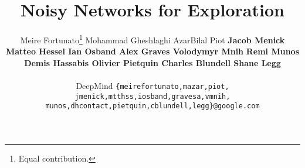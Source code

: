 \documentclass{article}
\title{Noisy Networks for Exploration}
\author{Meire Fortunato\thanks{Equal contribution.}
\quad Mohammad Gheshlaghi Azar\footnotemark[1]
\quad Bilal Piot \footnotemark[1] \And
\textbf{Jacob Menick
\quad  Matteo Hessel
\quad Ian Osband
\quad Alex Graves
\quad Volodymyr Mnih} \And
\textbf{Remi Munos
\quad Demis Hassabis 
\quad Olivier Pietquin
\quad Charles Blundell 
\quad Shane Legg}  \\ \\
DeepMind
  \texttt{\{meirefortunato,mazar,piot,} \\
  \texttt{jmenick,mtthss,iosband,gravesa,vmnih,}\\
  \texttt{munos,dhcontact,pietquin,cblundell,legg\}@google.com} \\
}
\begin{document}
\maketitle


\newcommand{\Exp}{\mathds{E}}
\newcommand{\Expk}{\mathds{E}_{k}}
\newcommand{\Nat}{\mathbb{N}}
\newcommand{\Ind}{\mathds{1}}
\newcommand{\Rmax}{R_{\rm max}}
\newcommand{\riskyopt}{\succcurlyeq_{\rm ro}}
\newcommand{\cid}{\succcurlyeq_{\rm CID}}
\newcommand{\so}{\succcurlyeq_{\rm so}}
\newcommand{\single}{\succcurlyeq_{\rm sc}}
\newcommand{\ssd}{\succcurlyeq_{\rm ssd}}
\newcommand{\pp}{\mathrel{+}\mathrel{+}}
\newcommand{\Xc}{\mathcal{X}}
\newcommand{\Yc}{\mathcal{Y}}
\newcommand{\Pc}{\mathcal{P}}
\newcommand{\Qc}{\mathcal{Q}}
\newcommand{\Ec}{\mathcal{E}}
\newcommand{\Fc}{\mathcal{F}}
\newcommand{\Gc}{\mathcal{G}}
\newcommand{\Rc}{\mathcal{R}}
\newcommand{\Sc}{\mathcal{S}}
\newcommand{\Ac}{\mathcal{A}}
\newcommand{\Mc}{\mathcal{M}}
\newcommand{\Tc}{\mathcal{T}}
\newcommand{\Vc}{\mathcal{V}}
\newcommand{\Dc}{\mathcal{D}}
\newcommand{\Bc}{\mathcal{B}}
\newcommand{\Hc}{\mathcal{H}}
\newcommand{\A}{\mathcal A}
\renewcommand{\S}{\mathcal S}
\newcommand{\X}{\mathcal X}
\newcommand{\D}{\mathcal D}
\newcommand{\G}{\mathcal G}
\newcommand{\K}{\mathcal K}
\newcommand{\calP}{\mathcal P}
\newcommand{\calI}{\mathcal I}
\newcommand{\barH}{\overline{H}}
\newcommand{\hh}{\hat h}
\renewcommand{\L}{\mathcal L}
\newcommand{\Hyp}{\mathcal H}
\newcommand{\Y}{\mathcal Y}
\newcommand{\B}{\mathcal B}
\newcommand{\C}{\mathcal C}
\newcommand{\F}{\mathcal F}
\newcommand{\E}{\mathbb E}
\newcommand{\W}{\mathcal W}
\newcommand{\Z}{\mathcal Z}
\newcommand{\calE}{\mathcal E}
\newcommand{\calS}{\mathcal{S}}
\newcommand{\calO}{\mathcal{O}}
\newcommand{\Cov}{\textnormal{Cov}}
\newcommand{\V}{\mathbb V}
\newcommand{\Prob}{\mathbb P}
\newcommand{\I}{\mathbb I}
\newcommand{\N}{\mathcal N}
\newcommand{\tM}{\widetilde{M}}
\newcommand{\balpha}{\boldsymbol \alpha}
\newcommand{\bmu}{\boldsymbol \mu}
\newcommand{\bSigma}{\boldsymbol \Sigma}
\newcommand{\bP}{\mathbf{P}}
\newcommand{\bhP}{\widehat{\mathbf{P}}}
\newcommand{\bT}{\boldsymbol{T}}
\newcommand{\bX}{\boldsymbol{X}}
\newcommand{\bY}{\boldsymbol{Y}}
\newcommand{\bx}{\boldsymbol{x}}
\newcommand{\MV}{\textnormal{MV}}
\newcommand{\hMV}{\widehat{\textnormal{MV}}}
\newcommand{\barmu}{\bar\mu}
\newcommand{\hpi}{\hat\pi}
\newcommand{\tDelta}{\widetilde{\Delta}}
\newcommand{\hmu}{\widehat{\mu}}
\newcommand{\hrho}{\hat\rho}
\newcommand{\heps}{\hat\eps}
\newcommand{\hnu}{\hat\nu}
\newcommand{\trho}{\tilde\rho}
\newcommand{\brho}{\bar\rho}
\newcommand{\hM}{\widehat{M}}
\end{document}
